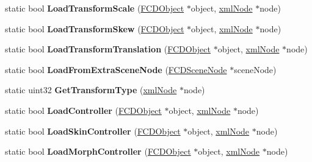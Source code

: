 \begin{DoxyCompactItemize}
\item 
\hypertarget{classFArchiveXML_abfd157c5d4f7569b81d84b7c493aa4e4}{
static bool {\bfseries LoadTransformScale} (\hyperlink{classFCDObject}{FCDObject} $\ast$object, \hyperlink{struct__xmlNode}{xmlNode} $\ast$node)}
\label{classFArchiveXML_abfd157c5d4f7569b81d84b7c493aa4e4}

\item 
\hypertarget{classFArchiveXML_a53c5e477e3f94544e64e8d5ab4beca3b}{
static bool {\bfseries LoadTransformSkew} (\hyperlink{classFCDObject}{FCDObject} $\ast$object, \hyperlink{struct__xmlNode}{xmlNode} $\ast$node)}
\label{classFArchiveXML_a53c5e477e3f94544e64e8d5ab4beca3b}

\item 
\hypertarget{classFArchiveXML_ab61719bd09628e5162b71a9b799b869b}{
static bool {\bfseries LoadTransformTranslation} (\hyperlink{classFCDObject}{FCDObject} $\ast$object, \hyperlink{struct__xmlNode}{xmlNode} $\ast$node)}
\label{classFArchiveXML_ab61719bd09628e5162b71a9b799b869b}

\item 
\hypertarget{classFArchiveXML_aed27eb532121fbeaf0d39c0ce5f5ff00}{
static bool {\bfseries LoadFromExtraSceneNode} (\hyperlink{classFCDSceneNode}{FCDSceneNode} $\ast$sceneNode)}
\label{classFArchiveXML_aed27eb532121fbeaf0d39c0ce5f5ff00}

\item 
\hypertarget{classFArchiveXML_a260ad693ec5a2cb70aef89db90f5ab60}{
static uint32 {\bfseries GetTransformType} (\hyperlink{struct__xmlNode}{xmlNode} $\ast$node)}
\label{classFArchiveXML_a260ad693ec5a2cb70aef89db90f5ab60}

\item 
\hypertarget{classFArchiveXML_a92f8ac29a7828b5a7d4084321463912d}{
static bool {\bfseries LoadController} (\hyperlink{classFCDObject}{FCDObject} $\ast$object, \hyperlink{struct__xmlNode}{xmlNode} $\ast$node)}
\label{classFArchiveXML_a92f8ac29a7828b5a7d4084321463912d}

\item 
\hypertarget{classFArchiveXML_a34c3cb5de48205da989e7755c2ffdc78}{
static bool {\bfseries LoadSkinController} (\hyperlink{classFCDObject}{FCDObject} $\ast$object, \hyperlink{struct__xmlNode}{xmlNode} $\ast$node)}
\label{classFArchiveXML_a34c3cb5de48205da989e7755c2ffdc78}

\item 
\hypertarget{classFArchiveXML_a7b81e68b09f6269713d4c9fe2ada5f43}{
static bool {\bfseries LoadMorphController} (\hyperlink{classFCDObject}{FCDObject} $\ast$object, \hyperlink{struct__xmlNode}{xmlNode} $\ast$node)}
\label{classFArchiveXML_a7b81e68b09f6269713d4c9fe2ada5f43}


\end{DoxyCompactItemize}
